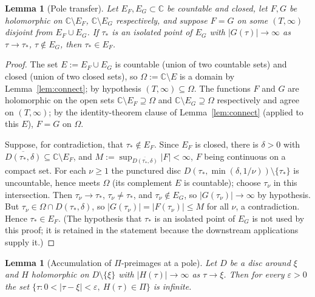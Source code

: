 \documentclass[11pt]{article}
\newtheorem{lemma}[theorem]{Lemma}
\theoremstyle{definition}
\theoremstyle{remark}
\theoremstyle{plain}
\newcommand{\C}{\mathbb{C}}
\begin{document}
\begin{lemma}[Pole transfer]\label{lem:transfer}
Let $E_F,E_G\subset\C$ be countable and closed, let $F,G$ be holomorphic on
$\C\setminus E_F$, $\C\setminus E_G$ respectively, and suppose $F=G$ on some
$(T,\infty)$ disjoint from $E_F\cup E_G$.  If $\tau_*$ is an isolated point of $E_G$ with
$|G(\tau)|\to\infty$ as $\tau\to\tau_*$, $\tau\notin E_G$, then $\tau_*\in E_F$.
\end{lemma}

\begin{proof}
The set $E:=E_F\cup E_G$ is countable (union of two countable sets) and closed (union of
two closed sets), so $\Omega:=\C\setminus E$ is a domain by Lemma~\ref{lem:connect}; by
hypothesis $(T,\infty)\subseteq\Omega$.  The functions $F$ and $G$ are holomorphic on the
open sets $\C\setminus E_F\supseteq\Omega$ and $\C\setminus E_G\supseteq\Omega$
respectively and agree on $(T,\infty)$; by the identity-theorem clause of
Lemma~\ref{lem:connect} (applied to this $E$), $F=G$ on $\Omega$.

Suppose, for contradiction, that $\tau_*\notin E_F$.  Since $E_F$ is closed, there is
$\delta>0$ with $\overline{D(\tau_*,\delta)}\subseteq\C\setminus E_F$, and
$M:=\sup_{\overline{D(\tau_*,\delta)}}|F|<\infty$, $F$ being continuous on a compact set.
For each $\nu\ge1$ the punctured disc $D(\tau_*,\min(\delta,1/\nu))\setminus\{\tau_*\}$ is
uncountable, hence meets $\Omega$ (its complement $E$ is countable); choose $\tau_\nu$ in
this intersection.  Then $\tau_\nu\to\tau_*$, $\tau_\nu\neq\tau_*$, and
$\tau_\nu\notin E_G$, so $|G(\tau_\nu)|\to\infty$ by hypothesis.  But
$\tau_\nu\in\Omega\cap D(\tau_*,\delta)$, so $|G(\tau_\nu)|=|F(\tau_\nu)|\le M$ for all
$\nu$, a contradiction.  Hence $\tau_*\in E_F$.  (The hypothesis that $\tau_*$ is an
isolated point of $E_G$ is not used by this proof; it is retained in the statement
because the downstream applications supply it.)
\end{proof}

\begin{lemma}[Accumulation of $\Pi$-preimages at a pole]\label{lem:T4}
Let $D$ be a disc around $\xi$ and $H$ holomorphic on $D\setminus\{\xi\}$ with
$|H(\tau)|\to\infty$ as $\tau\to\xi$.  Then for every $\varepsilon>0$ the set
$\{\tau:0<|\tau-\xi|<\varepsilon,\ H(\tau)\in\Pi\}$ is infinite.
\end{lemma}
\end{document}
